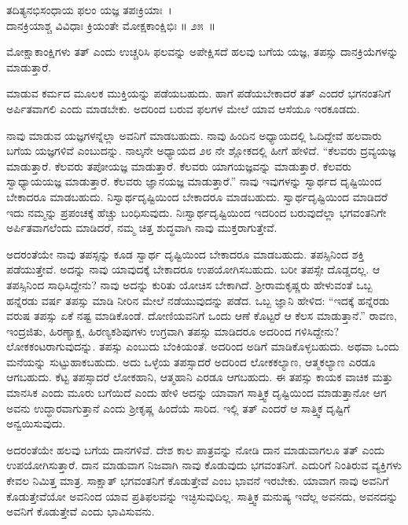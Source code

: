 \begin{shloka}
ತದಿತ್ಯನಭಿಸಂಧಾಯ ಫಲಂ ಯಜ್ಞ ತಪಃಕ್ರಿಯಾಃ~।\\ದಾನಕ್ರಿಯಾಶ್ಚ ವಿವಿಧಾಃ ಕ್ರಿಯಂತೇ ಮೋಕ್ಷಕಾಂಕ್ಷಿಭಿಃ \hfill॥ ೨೫~॥
\end{shloka}

\begin{artha}
ಮೋಕ್ಷಾಕಾಂಕ್ಷಿಗಳು ತತ್ ಎಂದು ಉಚ್ಚರಿಸಿ ಫಲವನ್ನು ಅಪೇಕ್ಷಿಸದೆ ಹಲವು ಬಗೆಯ ಯಜ್ಞ, ತಪಸ್ಸು ದಾನಕ್ರಿಯೆಗಳನ್ನು ಮಾಡುತ್ತಾರೆ.
\end{artha}

ಮಾಡುವ ಕರ್ಮದ ಮೂಲಕ ಮುಕ್ತಿಯನ್ನು ಪಡೆಯಬಹುದು. ಹಾಗೆ ಪಡೆಯಬೇಕಾದರೆ ತತ್ ಎಂದರೆ ಭಗನಂತನಿಗೆ ಅರ್ಪಿತವಾಗಲಿ ಎಂದು ಮಾಡಬೇಕು. ಅದರಿಂದ ಬರುವ ಫಲಗಳ ಮೇಲೆ ಯಾವ ಆಸೆಯೂ ಇರಕೂಡದು.

ನಾವು ಮಾಡುವ ಯಜ್ಞಗಳನ್ನೆಲ್ಲಾ ಅವನಿಗೆ ಮಾಡಬಹುದು. ನಾವು ಹಿಂದಿನ ಅಧ್ಯಾಯದಲ್ಲಿ ಓದಿದ್ದೇವೆ ಹಲವಾರು ಬಗೆಯ ಯಜ್ಞಗಳಿವೆ ಎಂಬುದನ್ನು. ನಾಲ್ಕನೇ ಅಧ್ಯಾಯದ ೨೮ ನೇ ಶ್ಲೋಕದಲ್ಲಿ ಹೀಗೆ ಹೇಳಿದೆ. “ಕೆಲವರು ದ್ರವ್ಯಯಜ್ಞ ಮಾಡುತ್ತಾರೆ. ಕೆಲವರು ತಪೋಯಜ್ಞ ಮಾಡುತ್ತಾರೆ. ಕೆಲವರು ಯಾಗಯಜ್ಞವನ್ನು ಮಾಡುತ್ತಾರೆ. ಕೆಲವರು ಸ್ವಾಧ್ಯಾಯಯಜ್ಞ ಮಾಡುತ್ತಾರೆ. ಕೆಲವರು ಜ್ಞಾನಯಜ್ಞ ಮಾಡುತ್ತಾರೆ.” ನಾವು ಇವುಗಳನ್ನು ಸ್ವಾರ್ಥದ ದೃಷ್ಟಿಯಿಂದ ಬೇಕಾದರೂ ಮಾಡಬಹುದು. ನಿಸ್ವಾರ್ಥದೃಷ್ಟಿಯಿಂದ ಬೇಕಾದರೂ ಮಾಡಬಹುದು. ಸ್ವಾರ್ಥದೃಷ್ಟಿಯಿಂದ ಮಾಡಿದರೆ ಇದು ನಮ್ಮನ್ನು ಪ್ರಪಂಚಕ್ಕೆ ಹೆಚ್ಚು ಬಂಧಿಸುವುದು. ನಿಃಸ್ವಾರ್ಥದೃಷ್ಟಿಯಿಂದ ಇದರಿಂದ ಬರುವುದೆಲ್ಲಾ ಭಗವಂತನಿಗೇ ಅರ್ಪಿತವಾಗಲೆಂದು ಮಾಡಿದರೆ, ನಮ್ಮ ಚಿತ್ತ ಶುದ್ಧವಾಗಿ ನಾವು ಮುಕ್ತರಾಗುತ್ತೇವೆ.

ಅದರಂತೆಯೇ ನಾವು ತಪಸ್ಸನ್ನು ಕೂಡ ಸ್ವಾರ್ಥ ದೃಷ್ಟಿಯಿಂದ ಬೇಕಾದರೂ ಮಾಡಬಹುದು. ತಪಸ್ಸಿನಿಂದ ಶಕ್ತಿ ಪಡೆಯುತ್ತೇವೆ. ಅದನ್ನು ನಾವು ಯಾವುದಕ್ಕೆ ಬೇಕಾದರೂ ಉಪಯೋಗಿಸಬಹುದು. ಬರೀ ತಪಸ್ಸೇ ದೊಡ್ಡದಲ್ಲ. ಆ ತಪಸ್ಸಿನಿಂದ ಸಾಧಿಸಿದ್ದೇನು? ನಾವು ಅದನ್ನು ಕುರಿತು ಯೋಚಿಸ ಬೇಕಾಗಿದೆ. ಶ‍್ರೀರಾಮಕೃಷ್ಣರು ಹೇಳುವಂತೆ ಒಬ್ಬ ಹನ್ನೆರಡು ವರ್ಷ ತಪಸ್ಸು ಮಾಡಿ ನೀರಿನ ಮೇಲೆ ನಡೆಯುವುದನ್ನು ಪಡೆದ. ಒಬ್ಬ ಜ್ಞಾನಿ ಹೇಳಿದ: “ಇದಕ್ಕೆ ಹನ್ನೆರಡು ವರುಷ ತಪಸ್ಸು ಏಕೆ ನಷ್ಟ ಮಾಡಿಕೊಂಡೆ. ದೋಣಿಯವನಿಗೆ ಒಂದು ಆಣೆ ಕೊಟ್ಟರೆ ಆ ಕೆಲಸ ಮಾಡುತ್ತಾನೆ.” ರಾವಣ, ಇಂದ್ರಜಿತು, ಹಿರಣ್ಯಾಕ್ಷ, ಹಿರಣ್ಯಕಶಿಪುಗಳು ಉಗ್ರವಾಗಿ ತಪಸ್ಸು ಮಾಡಿದರೂ ಅದರಿಂದ ಗಳಿಸಿದ್ದೇನು? ಲೋಕಕಂಟರಾಗುವುದನ್ನು. ತಪಸ್ಸು ಎಂಬುದು ಬೆಂಕಿಯಂತೆ. ಅದರಿಂದ ಅಡಿಗೆ ಮಾಡಿಕೊಳ್ಳಬಹುದು. ಅಥವಾ ಒಂದು ಮನೆಯನ್ನು ಸುಟ್ಟುಹಾಕಬಹುದು. ಅದು ಒಳ್ಳೆಯ ತಪಸ್ಸಾದರೆ ಅದರಿಂದ ಲೋಕಕಲ್ಯಾಣ, ಆತ್ಮಕಲ್ಯಾಣ ಎರಡೂ ಆಗಬಹುದು. ಕೆಟ್ಟ ತಪಸ್ಸಾದರೆ ಲೋಕಹಾನಿ, ಆತ್ಮಹಾನಿ ಎರಡೂ ಆಗಬಹುದು. ಈ ತಪಸ್ಸು ಕಾಯಕ ವಾಚಿಕ ಮತ್ತು ಮಾನಸಿಕ ಎಂದು ಮೂರು ಬಗೆಯಿದೆ ಎಂದು ಹೇಳಿ ಅದನ್ನು ಯಾವಾಗ ಸಾತ್ತ್ವಿಕ ದೃಷ್ಟಿಯಿಂದ ಮಾಡುತ್ತಾನೋ ಆಗ ಅವನು ಉದ್ಧಾರವಾಗುತ್ತಾನೆ ಎಂದು ಶ‍್ರೀಕೃಷ್ಣ ಹಿಂದೆಯೆ ಸಾರಿದ. ಇಲ್ಲಿ ತತ್ ಎಂದರೆ ಆ ಸಾತ್ತ್ವಿಕ ದೃಷ್ಟಿಗೆ ಅನ್ವಯಿಸುವುದು.

ಅದರಂತೆಯೇ ಹಲವು ಬಗೆಯ ದಾನಗಳಿವೆ. ದೇಶ ಕಾಲ ಪಾತ್ರವನ್ನು ನೋಡಿ ದಾನ ಮಾಡುವಾಗಲೂ ತತ್ ಎಂದು ಉಪಯೋಗಿಸುತ್ತಾರೆ. ದಾನ ಮಾಡುವಾಗ ನಿಜವಾಗಿ ನಾವು ಕೊಡುವುದು ಭಗವಂತನಿಗೆ. ಎದುರಿಗೆ ನಿಂತಿರುವ ವ್ಯಕ್ತಿಗಳು ಕೇವಲ ನಿಮಿತ್ತ ಮಾತ್ರ. ಸಾಕ್ಷಾತ್ ಭಗವಂತನಿಗೆ ಕೊಡುತ್ತೇವೆ ಎಂಬ ಭಾವನೆ ಇರಬೇಕು. ಯಾವಾಗ ನಾವು ಅವನಿಗೆ ಕೊಡು\-ತ್ತೇವೆಯೋ ಅವನಿಂದ ಯಾವ ಪ್ರತಿಫಲವನ್ನು ಇಚ್ಛಿಸುವುದಿಲ್ಲ. ಸಾತ್ತ್ವಿಕ ಮನುಷ್ಯ ಇದೆಲ್ಲ ಅವನದು, ಅವನದನ್ನು ಅವನಿಗೆ ಕೊಡುತ್ತೇವೆ ಎಂದು ಭಾವಿಸುವನು.

